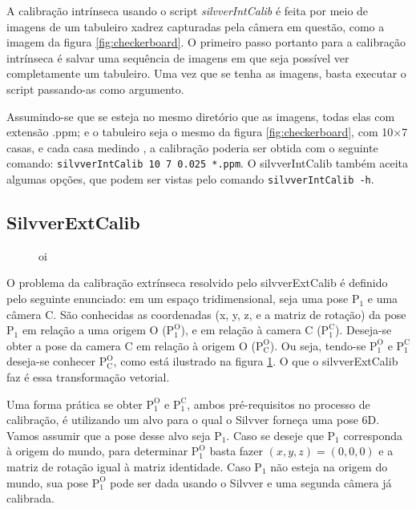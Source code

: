 \documentclass[a4paper,10pt]{article}
\begin{document}
A calibração intrínseca usando o script \emph{silvverIntCalib} é feita por
meio de imagens de um tabuleiro xadrez capturadas pela câmera em questão, como
a imagem da figura \ref{fig:checkerboard}. O primeiro passo portanto para a
calibração intrínseca é salvar uma sequência de imagens em que seja possível
ver completamente um tabuleiro. Uma vez que se tenha as imagens, basta
executar o script passando-as como argumento.

Assumindo-se que se esteja no mesmo diretório que as imagens, todas elas com
extensão .ppm; e o tabuleiro seja o mesmo da figura \ref{fig:checkerboard},
com 10$\times$7 casas, e cada casa medindo , a calibração
poderia ser obtida com o seguinte comando: \texttt{silvverIntCalib 10 7 0.025
  *.ppm}. O silvverIntCalib também aceita algumas opções, que podem ser vistas
pelo comando \texttt{silvverIntCalib -h}.

\subsection{SilvverExtCalib}

\begin{figure}[h]
  \centering
  \caption{oi}
  \label{fig:silvverExtCalib}
\end{figure}

O problema da calibração extrínseca resolvido pelo silvverExtCalib é definido
pelo seguinte enunciado: em um espaço tridimensional, seja uma pose
$\mathrm{P_1}$ e uma câmera C. São conhecidas as coordenadas (x, y, z, e a
matriz de rotação) da pose $\mathrm{P_1}$ em relação a uma origem O
($\mathrm{P_1^O}$), e em relação à camera C ($\mathrm{P_1^C}$). Deseja-se
obter a pose da camera C em relação à origem O ($\mathrm{P_C^O}$). Ou seja,
tendo-se $\mathrm{P_1^O}$ e $\mathrm{P_1^C}$ deseja-se conhecer
$\mathrm{P_C^O}$, como está ilustrado na figura \ref{fig:silvverExtCalib}. O
que o silvverExtCalib faz é essa transformação vetorial.


Uma forma prática se obter $\mathrm{P_1^O}$ e $\mathrm{P_1^C}$, ambos
pré-requisitos no processo de calibração, é utilizando um alvo para o qual o
Silvver forneça uma pose 6D. Vamos assumir que a pose desse alvo seja
$\mathrm{P_1}$. Caso se deseje que $\mathrm{P_1}$ corresponda à origem do mundo, para
determinar $\mathrm{P_1^O}$ basta fazer $(x,y,z) = (0,0,0)$ e a matriz de
rotação igual à matriz identidade. Caso $\mathrm{P_1}$ não esteja na origem do
mundo, sua pose $\mathrm{P_1^O}$ pode ser dada usando o Silvver e uma segunda
câmera já calibrada.
\end{document}

